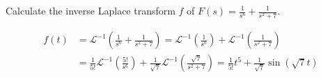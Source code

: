 \documentclass[notes]{subfiles}
\begin{document}
\begin{exercise}
    Calculate the inverse Laplace transform $f$ of $F(s) = \frac{1}{s^6} + \frac{1}{s^2 + 7}$.
\end{exercise}
\begin{solution}
    \begin{align*}
        f(t)
        &= \mathcal{L}^{-1}\left(\frac{1}{s^6} + \frac{1}{s^2 + 7}\right)
        = \mathcal{L}^{-1}\left(\frac{1}{s^6}\right) + \mathcal{L}^{-1}\left(\frac{1}{s^2 + 7}\right) \\
        &= \frac{1}{5!}\mathcal{L}^{-1}\left(\frac{5!}{s^6}\right) + \frac{1}{\sqrt{7}}\mathcal{L}^{-1}\left(\frac{\sqrt{7}}{s^2 + 7}\right)
        = \frac{1}{5!}t^5 + \frac{1}{\sqrt{7}}\sin(\sqrt{7}t)
    \end{align*}
\end{solution}
\end{document}
